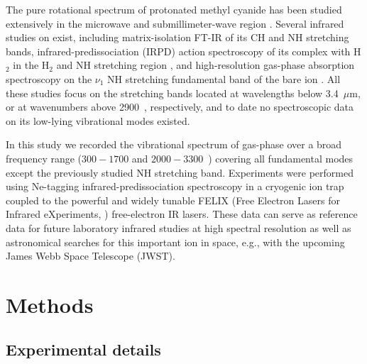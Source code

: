 The pure rotational spectrum of protonated methyl cyanide has been studied extensively in the microwave \cite{GAM2000} and submillimeter-wave region \cite{AHH2006}.
Several infrared studies on \pa exist, including matrix-isolation FT-IR \cite{Frankowski2005} of its CH and NH stretching bands, infrared-predissociation (IRPD) action spectroscopy of its complex with H$_2$ in the H$_2$ and NH stretching region \cite{DRO1999}, and high-resolution gas-phase absorption spectroscopy on the $\nu_1$ NH stretching fundamental band of the bare ion \cite{Amano1988, Amano1992}. All these studies focus on the stretching bands located at wavelengths below 3.4~$\mu$m, or at wavenumbers above 2900~\wn, respectively, and to date no spectroscopic data on its low-lying vibrational modes existed.

In this study we recorded the vibrational spectrum of gas-phase \pa over a broad frequency range  ($300-1700$ and $2000-3300$~\wn) covering all fundamental modes except the previously studied NH stretching band. Experiments were performed using Ne-tagging infrared-predissociation spectroscopy in a cryogenic ion trap coupled to the powerful and widely tunable FELIX (Free Electron Lasers for Infrared eXperiments, \cite{oepts_free-electron-laser_1995}) free-electron IR lasers. These data can serve as reference data for future laboratory infrared studies at high spectral resolution as well as astronomical searches for this important ion in space, e.g., with the upcoming James Webb Space Telescope (JWST). 


\section{Methods}

\subsection{Experimental details}

